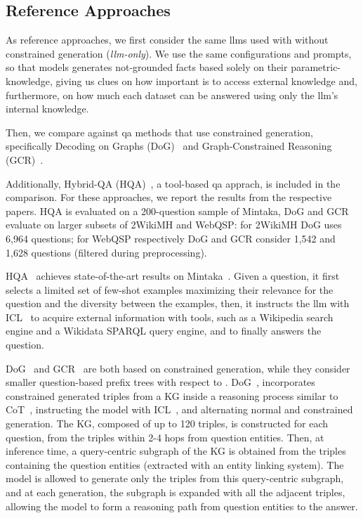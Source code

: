 \subsection{Reference Approaches}
As reference approaches, we first consider the same \acp{llm} used with  without constrained generation (\textit{\ac{llm}-only}). We use the same configurations and prompts, so that models generates not-grounded facts based solely on their parametric-knowledge, giving us clues on how important is to access external knowledge and, furthermore, on how much each dataset can be answered using only the \ac{llm}'s internal knowledge.
%

Then, we compare against \ac{qa} methods that use constrained generation, specifically Decoding on Graphs (DoG)~\cite{li-etal-2025-decoding-graphs} and Graph-Constrained Reasoning (GCR)~\cite{luo2024graphconstrainedreasoningfaithfulreasoning}.

Additionally, Hybrid-QA (HQA)~\cite{lehmann2024beyond}, a tool-based \ac{qa} apprach, is included in the comparison. For these approaches, we report the results from the respective papers. HQA is evaluated on a 200-question sample of Mintaka, DoG and GCR evaluate on larger subsets of 2WikiMH and WebQSP: for 2WikiMH DoG uses 6,964 questions; for WebQSP respectively DoG and GCR consider 1,542 and 1,628 questions (filtered during preprocessing).

%
HQA~\cite{lehmann2024beyond} achieves state-of-the-art results on Mintaka~\cite{sen-etal-2022-mintaka}. 
% 
Given a question, it first selects a limited set of few-shot examples maximizing their relevance for the question and the diversity between the examples, then, it instructs the \ac{llm} with ICL~\cite{dong2024survey} to acquire external information with tools, such as a Wikipedia search engine and a Wikidata SPARQL query engine, and to finally answers the question.

DoG~\cite{li-etal-2025-decoding-graphs} and GCR~\cite{luo2024graphconstrainedreasoningfaithfulreasoning} are both based on constrained generation, while they consider smaller question-based prefix trees with respect to .
DoG~\cite{li-etal-2025-decoding-graphs},
incorporates constrained generated triples from a KG inside a reasoning process similar to CoT~\cite{wei2022chainofthought}, instructing the model with ICL~\cite{dong2024survey}, and alternating normal and constrained generation.
The KG, composed of up to 120 triples, is constructed for each question, from the triples within 2-4 hops from question entities. Then, at inference time, a query-centric subgraph of the KG is obtained from the triples containing the question entities (extracted with an entity linking system). The model is allowed to generate only the triples from this query-centric subgraph, and at each generation, the subgraph is expanded with all the adjacent triples, allowing the model to form a reasoning path from question entities to the answer.
% 
% 



